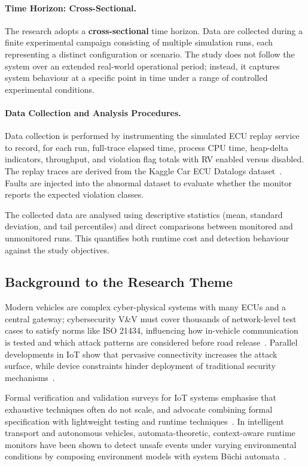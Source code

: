 \paragraph{Time Horizon: Cross-Sectional.}
The research adopts a \textbf{cross-sectional} time horizon. Data are collected during a finite experimental campaign consisting of multiple simulation runs, each representing a distinct configuration or scenario. The study does not follow the system over an extended real-world operational period; instead, it captures system behaviour at a specific point in time under a range of controlled experimental conditions.

\paragraph{Data Collection and Analysis Procedures.}
Data collection is performed by instrumenting the simulated ECU replay service to record, for each run, full-trace elapsed time, process CPU time, heap-delta indicators, throughput, and violation flag totals with RV enabled versus disabled. The replay traces are derived from the Kaggle Car ECU Datalogs dataset~\cite{gxkok21ecudatalogs}. Faults are injected into the abnormal dataset to evaluate whether the monitor reports the expected violation classes.

The collected data are analysed using descriptive statistics (mean, standard deviation, and tail percentiles) and direct comparisons between monitored and unmonitored runs. This quantifies both runtime cost and detection behaviour against the study objectives.

\subsection{Background to the Research Theme}

Modern vehicles are complex cyber-physical systems with many ECUs and a central gateway; cybersecurity V\&V must cover thousands of network-level test cases to satisfy norms like ISO 21434, influencing how in-vehicle communication is tested and which attack patterns are considered before road release~\cite{ekert2021cybersecurity}. Parallel developments in IoT show that pervasive connectivity increases the attack surface, while device constraints hinder deployment of traditional security mechanisms~\cite{williams2022survey}.

Formal verification and validation surveys for IoT systems emphasise that exhaustive techniques often do not scale, and advocate combining formal specification with lightweight testing and runtime techniques~\cite{krichen2023survey}. In intelligent transport and autonomous vehicles, automata-theoretic, context-aware runtime monitors have been shown to detect unsafe events under varying environmental conditions by composing environment models with system B\"uchi automata~\cite{zhang2024context}.

